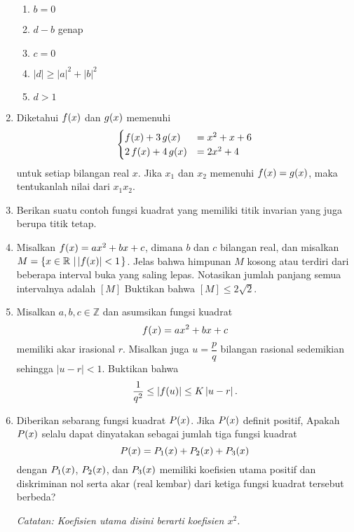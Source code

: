 \begin{enumerate}[topsep=0pt]
		\begin{multcols}
			\begin{enumerate}
				\item $ b = 0 $
				\item $ d - b $ genap
				\item $ c = 0 $
				\item $ \left|d\right| \geq \left|a\right|^{2} + \left|b\right|^{2} $
				\item $ d > 1 $
			\end{enumerate}
		\end{multcols}
		\item Diketahui $ \mathop{}\!{f}{\left({x}\right)} $ dan $ \mathop{}\!{g}{\left({x}\right)} $ memenuhi
		\[
			\begin{cases}
				\mathop{}\!{f}{\left({x}\right)} + 3\mathop{}\!{g}{\left({x}\right)} &= x^{2} + x + 6 \\
				2\mathop{}\!{f}{\left({x}\right)} + 4\mathop{}\!{g}{\left({x}\right)} &= 2x^{2} + 4
			\end{cases}
		\]
		untuk setiap bilangan real $ x $. Jika $ x_{1} $ dan $ x_{2} $ memenuhi $ \mathop{}\!{f}{\left({x}\right)} = \mathop{}\!{g}{\left({x}\right)} $, maka tentukanlah nilai dari $ x_{1}x_{2} $.
		\item Berikan suatu contoh fungsi kuadrat yang memiliki titik invarian yang juga berupa titik tetap.
		\item \probtype{*} Misalkan $ \mathop{}\!{f}{\left({x}\right)} = ax^{2} + bx + c $, dimana $ b $ dan $ c $ bilangan real, dan misalkan $ M = \mathop{}\!\left\lbrace{{x \in \mathbb{R}} \, \left|\, {\left|\mathop{}\!{f}{\left({x}\right)}\right| < 1}\right.}\right\rbrace $. Jelas bahwa himpunan $ M $ kosong atau terdiri dari beberapa interval buka yang saling lepas. Notasikan jumlah panjang semua intervalnya adalah $ \left\lbrack{M}\right\rbrack $ Buktikan bahwa $ \left\lbrack{M}\right\rbrack \leq 2\sqrt{2} $.
		\item \probtype{*} Misalkan $ a, b, c \in \mathbb{Z} $ dan asumsikan fungsi kuadrat
		\[ \mathop{}\!{f}{\left({x}\right)} = ax^{2} + bx + c \]
		memiliki akar irasional $ r $. Misalkan juga $ u = \dfrac{p}{q} $ bilangan rasional sedemikian sehingga $ \left|u - r\right| < 1 $. Buktikan bahwa
		\[ \frac{1}{q^{2}} \leq \left|\mathop{}\!{f}{\left({u}\right)}\right| \leq K\left|u - r\right|. \]
		\item \probtype{*} Diberikan sebarang fungsi kuadrat $ \mathop{}\!{P}{\left({x}\right)} $. Jika $ \mathop{}\!{P}{\left({x}\right)} $ definit positif, Apakah $ \mathop{}\!{P}{\left({x}\right)} $ selalu dapat dinyatakan sebagai jumlah tiga fungsi kuadrat
		\[ \mathop{}\!{P}{\left({x}\right)} = \mathop{}\!{P_{1}}{\left({x}\right)} + \mathop{}\!{P_{2}}{\left({x}\right)} + \mathop{}\!{P_{3}}{\left({x}\right)} \]
		dengan $ \mathop{}\!{P_{1}}{\left({x}\right)} $, $ \mathop{}\!{P_{2}}{\left({x}\right)} $, dan $ \mathop{}\!{P_{3}}{\left({x}\right)} $ memiliki koefisien utama positif dan diskriminan nol serta akar (real kembar) dari ketiga fungsi kuadrat tersebut berbeda?
		\par \noindent \textit{Catatan: Koefisien utama disini berarti koefisien $ x^{2} $.}
	\end{enumerate}